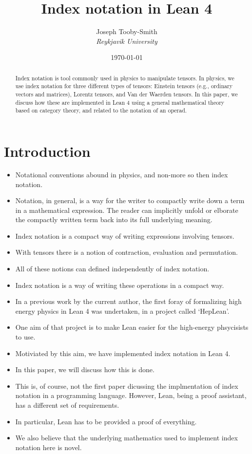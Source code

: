 \documentclass[a4paper, 11pt]{article}
\title{Index notation in Lean 4}
\author{Joseph Tooby-Smith \\ \textit{Reykjavik University}}
\date{\today}
\begin{document}
\maketitle
\vspace{-1cm}
\begin{abstract}
Index notation is tool commonly used in physics to manipulate tensors.
In physics, we use index notation for three different types of tensors: 
Einstein tensors (e.g., ordinary vectors and matrices), Lorentz tensors, and 
Van der Waerden tensors. In this paper, we discuss how these are implemented in Lean 4 using a 
general mathematical theory based on category theory, and related to the notation of an operad.
\end{abstract}

\section{Introduction}

\begin{itemize}
\item Notational conventions abound in physics, and non-more so then index notation. 
\item Notation, in general, is a way for the writer to compactly write down a term in a 
  mathematical expression. The reader can implicitly unfold or elborate the compactly written term 
  back into its full underlying meaning. 
\item Index notation is a compact way of writing expressions involving tensors.
\item With tensors there is a notion of contraction, evaluation and permutation.
\item All of these notions can defined independently of index notation.
\item Index notation is a way of writing these operations in a compact way.
\item In a previous work by the current author, the first foray of formalizing high energy physics 
  in Lean 4 was undertaken, in a project called `HepLean'.
\item One aim of that project is to make Lean easier for the high-energy phsycisists to use. 
\item Motiviated by this aim, we have implemented index notation in Lean 4.
\item In this paper, we will discuss how this is done.
\item This is, of course, not the first paper dicussing the implmentation of index notation in a 
  programming language. However, Lean, being a proof assistant, has a different set of requirements. 
\item In particular, Lean has to be provided a proof of everything. 
\item We also believe that the underlying mathematics used to implement index notation here 
 is novel. 
\end{itemize}
\end{document}
